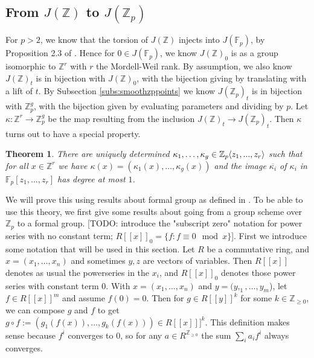 \documentclass{article}
\newcommand{\Z}{\mathbb{Z}}
\newcommand{\F}{\mathbb{F}}
\renewcommand{\angle}[1]{\hspace{-2pt}\left\langle #1 \right\rangle}
\theoremstyle{plain}
\newtheorem{thm}{Theorem}[section] %
\theoremstyle{definition}
\theoremstyle{remark}
\begin{document}
\subsection{From \texorpdfstring{$J(\Z)$}{J(Z)} to \texorpdfstring{$J(\Z_p)$}{J(Z\_p)}}
For $p > 2$, we know that the torsion of $J(\Z)$ injects into $J(\F_p)$, by Proposition 2.3 of \cite{pierre2000}. Hence for $0 \in J(\F_p)$, we know $J(\Z)_0$ is as a group isomorphic to $\Z^r$ with $r$ the Mordell-Weil rank. By assumption, we also know $J(\Z)_t$ is in bijection with $J(\Z)_0$, with the bijection giving by translating with a lift of $t$. By Subsection \ref{subs:smoothzppoints} we know $J(\Z_p)_t$ is in bijection with $\Z_p^{g}$, with the bijection given by evaluating parameters and dividing by $p$. Let $\kappa: \Z^r \to \Z_p^g$ be the map resulting from the inclusion $J(\Z)_t \to J(\Z_p)_t$. Then $\kappa$ turns out to have a special property.

\begin{thm}
\label{thm:kappanice}
There are uniquely determined $\kappa_1,\dots,\kappa_g \in \Z_p\angle{z_1,...,z_r}$ such that for all $x \in \Z^r$ we have $\kappa(x) = (\kappa_1(x),\dots,\kappa_g(x))$ and the image $\overline{\kappa_i}$ of $\kappa_i$ in $\F_p[z_1,...,z_r]$ has degree at most $1$.
\end{thm}

We will prove this using results about formal group as defined in \citep{honda70}. To be able to use this theory, we first give some results about going from a group scheme over $\Z_p$ to a formal group.
[TODO: introduce the "subscript zero" notation for power series with no constant term; $R[[x]]_0 = \{f: f \equiv 0 \mod x\}$].
First we introduce some notation that will be used in this section. Let $R$ be a commutative ring, and $x = (x_1,\dots,x_n)$ and sometimes $y,z$ are vectors of variables. Then $R[[x]]$ denotes as usual the powerseries in the $x_i$, and $R[[x]]_0$ denotes those power series with constant term $0$. With $x = (x_1,\dots,x_n)$ and $y = (y,_1,\dots,y_m$), let $f \in R[[x]]^m$ and assume $f(0) = 0$. Then for $g \in R[[y]]^k$ for some $k\in\Z_{\geq 0}$, we can compose $g$ and $f$ to get $g\circ f := (g_1(f(x)),\dots,g_k(f(x)))\in R[[x]]]^k$. This definition makes sense because $f^i$ converges to $0$, so for any $a \in R^{\Z_{\geq 0}} $ the sum $\sum_i a_i f^i$ always converges. 
\end{document}

